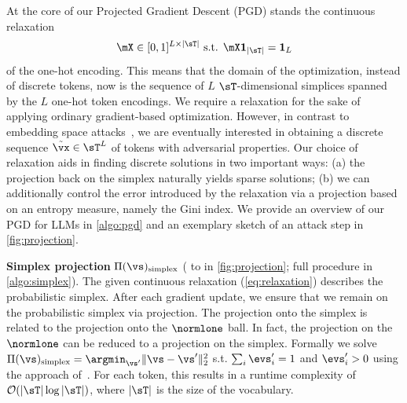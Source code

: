 \documentclass{article}
\theoremstyle{plain}
\theoremstyle{definition}
\theoremstyle{remark}
\begin{document}
At the core of our Projected Gradient Descent (PGD) stands the continuous relaxation
\begin{equation}\label{eq:relaxation}
    \mX \in [0,1]^{L\times|\sT|}\text{ s.t. } \mX \mathbf{1}_{|\sT|} = \mathbf{1}_{L}
\end{equation}
of the one-hot encoding. This means that the domain of the optimization, instead of discrete tokens, now is the sequence of \(L\) \(\sT\)-dimensional simplices spanned by the \(L\) one-hot token encodings. We require a relaxation for the sake of applying ordinary gradient-based optimization. However, in contrast to embedding space attacks~\citep{schwinn_adversarial_2023}, we are eventually interested in obtaining a discrete sequence \(\tilde{\vx} \in \sT^L\) of tokens with adversarial properties. Our choice of relaxation aids in finding discrete solutions in two important ways: (a) the projection back on the simplex naturally yields sparse solutions; (b) we can additionally control the error introduced by the relaxation via a projection based on an entropy measure, namely the Gini index. We provide an overview of our PGD for LLMs in \autoref{algo:pgd} and an exemplary sketch of an attack step in \autoref{fig:projection}.


\textbf{Simplex projection} \(\Pi(\vs)_{\text{simplex}}\) ( to  in \autoref{fig:projection}; full procedure in \autoref{algo:simplex}). The given continuous relaxation (\autoref{eq:relaxation}) describes the probabilistic simplex. After each gradient update, we ensure that we remain on the probabilistic simplex via projection. The projection onto the simplex is related to the projection onto the \(\normlone\) ball. In fact, the projection on the \(\normlone\) can be reduced to a projection on the simplex. Formally we solve \(\Pi(\vs)_{\text{simplex}} = \argmin_{\vs'} \|\vs - \vs'\|_2^2\) s.t. \(\sum_i \evs'_i = 1\) and \(\evs'_i > 0\) using the approach of~\citet{duchi_efficient_2008}. For each token, this results in a runtime complexity of \(\mathcal{O}(|\sT| \log |\sT|)\), where \(|\sT|\) is the size of the vocabulary.
\end{document}
